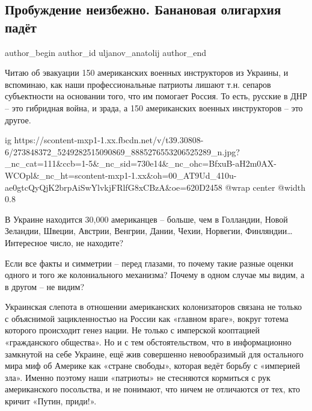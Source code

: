  
 
 
 
 
 
\subsection{Пробуждение неизбежно. Банановая олигархия падёт}
\label{sec:12_02_2022.fb.uljanov_anatolij.1.probuzhdenie_neizbezhno}
 
\ifcmt
 author_begin
   author_id uljanov_anatolij
 author_end
\fi

Читаю об эвакуации 150 американских военных инструкторов из Украины, и
вспоминаю, как наши профессиональные патриоты лишают т.н. сепаров субъектности
на основании того, что им помогает Россия. То есть, русские в ДНР – это
гибридная война, и зрада, а 150 американских военных инструкторов – это другое. 

\ifcmt
  ig https://scontent-mxp1-1.xx.fbcdn.net/v/t39.30808-6/273848372_5249282515090869_8885276553206525289_n.jpg?_nc_cat=111&ccb=1-5&_nc_sid=730e14&_nc_ohc=BfxuB-aH2m0AX-WCOpl&_nc_ht=scontent-mxp1-1.xx&oh=00_AT9Ud_410u-ae0gtcQyQjK2brpAiSwYlvkjFRlfG8xCBzA&oe=620D2458
  @wrap center
  @width 0.8
\fi

В Украине находится 30,000 американцев – больше, чем в Голландии, Новой
Зеландии, Швеции, Австрии, Венгрии, Дании, Чехии, Норвегии, Финляндии…
Интересное число, не находите? 

Если все факты и симметрии – перед глазами, то почему такие разные оценки
одного и того же колониального механизма? Почему в одном случае мы видим, а в
другом – не видим? 

Украинская слепота в отношении американских колонизаторов связана не только с
объяснимой зацикленностью на России как «главном враге», вокруг тотема которого
происходит генез нации. Не только с имперской кооптацией «гражданского
общества». Но и с тем обстоятельством, что в информационно замкнутой на себе
Украине, ещё жив совершенно невообразимый для остального мира миф об Америке
как «стране свободы», которая ведёт борьбу с «империей зла». Именно поэтому
наши «патриоты» не стесняются кормиться с рук американского посольства, и не
понимают, что ничем не отличаются от тех, кто кричит «Путин, приди!». 

